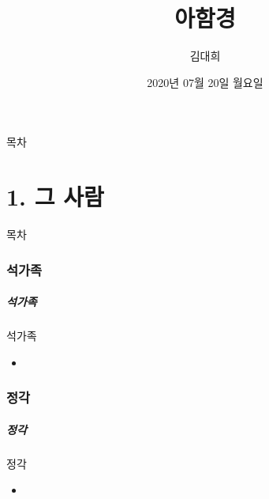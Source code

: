 \documentclass[aspectratio=1610,17pt,xcolor=pdftex,dvipsnames,table,handout]{beamer}
\begin{document}
	

			\title{ 아함경 }
			\author{ 김대희 }
			\date{ 2020년 07월 20일 월요일 }


%
%
%
%


		\begin{frame}[plain]
		\titlepage
		\end{frame}


		\begin{frame} [plain]{목차}
		\tableofcontents%
		\end{frame}



		\part{ 1. 그 사람 }
		\frame{\partpage}

		\begin{frame} [plain]{목차}
		\tableofcontents%
		\end{frame}
		

		\section{ 석가족 }
		\begin{frame} [t,plain]
		\frametitle{		석가족	}	
			\begin{block} { 		석가족	}
			\setlength{\leftmargini}{5em}			
			\begin{itemize}
				\item 
			\end{itemize}
			\end{block}						

		\end{frame}						
		

		\section{ 정각 }
		\begin{frame} [t,plain]
		\frametitle{		정각	}	
			\begin{block} { 		정각	}
			\setlength{\leftmargini}{5em}			
			\begin{itemize}
				\item 
			\end{itemize}
			\end{block}			

								
		\end{frame}						
	
\end{document}
